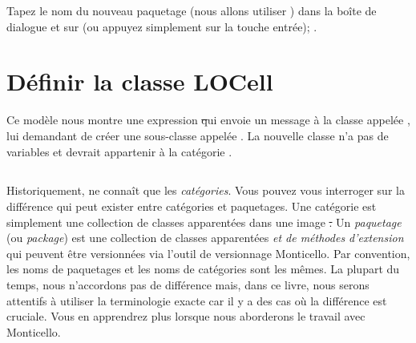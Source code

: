 \documentclass[a4paper,10pt,twoside]{book}
\begin{document}
Tapez le nom du nouveau paquetage (nous allons utiliser
) dans la boîte de dialogue et \clickz{} sur
 (ou appuyez simplement sur la touche entrée); .

\section{Définir la classe LOCell}


Ce modèle nous montre une expression \st qui envoie un message à la
classe appelée , lui demandant de créer une sous-classe
appelée .  La nouvelle classe n'a pas de variables
et devrait appartenir à la catégorie .

\subsection{}

Historiquement, \st{} ne connaît que les \emph{catégories}. Vous
pouvez vous interroger sur la différence qui peut exister entre
catégories et paquetages.
Une catégorie est simplement une collection de classes apparentées
dans une image \st. Un \emph{paquetage} (ou \emph{package})
est une collection de classes apparentées \emph{et de méthodes
  d'extension} qui peuvent être versionnées via l'outil de versionnage
Monticello.
Par convention, les noms de paquetages et les noms de catégories sont
les mêmes.
La plupart du temps, nous n'accordons pas de différence mais, dans ce
livre, nous serons attentifs à utiliser la terminologie exacte car il
y a des cas où la différence est cruciale.
Vous en apprendrez plus lorsque nous aborderons le travail avec
Monticello.

\end{document}
